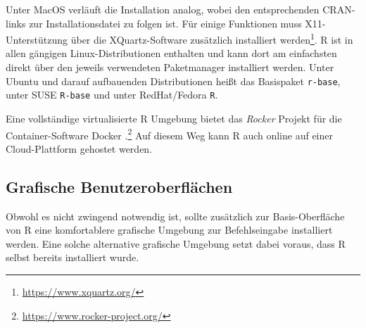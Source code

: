 Unter MacOS verläuft die Installation analog, wobei den entsprechenden CRAN-links zur Installationsdatei zu folgen ist. Für einige Funktionen muss X11-Unterstützung über die XQuartz-Software zusätzlich installiert werden\footnote{\url{https://www.xquartz.org/}}. R ist in allen gängigen Linux-Distributionen enthalten und kann dort am einfachsten direkt über den jeweils verwendeten Paketmanager installiert werden. Unter Ubuntu und darauf aufbauenden Distributionen heißt das Basispaket \lstinline!r-base!, unter SUSE \lstinline!R-base! und unter RedHat/Fedora \lstinline!R!.

Eine vollständige virtualisierte R Umgebung bietet das \emph{Rocker} Projekt für die Container-Software Docker \cite{Boettiger2017}.\footnote{\url{https://www.rocker-project.org/}} Auf diesem Weg kann R auch online auf einer Cloud-Plattform gehostet werden.

\subsection{Grafische Benutzeroberflächen}
\label{sec:gui}

Obwohl es nicht zwingend notwendig ist, sollte zusätzlich zur Basis-Oberfläche von R eine komfortablere grafische Umgebung zur Befehlseingabe installiert werden. Eine solche alternative grafische Umgebung setzt dabei voraus, dass R selbst bereits installiert wurde.

